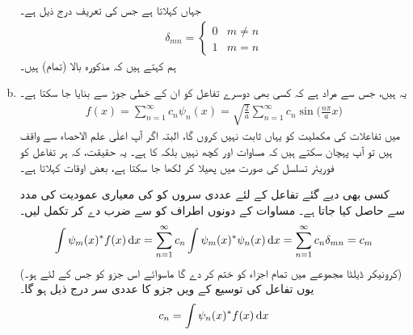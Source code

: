 \begin{enumerate}[a.]
جہاں   کہلاتا ہے جس کی تعریف درج ذیل ہے۔ 
\begin{align}
\delta_{mn}=
\begin{cases}
0& m\neq n\\
1 & m=n
\end{cases}
\end{align} 
ہم کہتے ہیں کہ مذکورہ بالا (تمام)   ہیں۔ 
\item
 یہ  ہیں، جس سے مراد ہے کہ کسی بھی دوسرے تفاعل  کو ان کے خطی جوڑ سے بنایا جا سکتا ہے۔
\begin{align}\label{مساوات_شروڈنگر_کوئی_تفاعل}
f(x)=\sum_{n=1}^{\infty}c_{n}\psi_{n}(x)=\sqrt{\frac{2}{a}}\sum_{n=1}^{\infty}c_{n}\sin\big(\frac{n\pi}{a}x\big)
\end{align}
 میں تفاعلات  کی مکملیت کو یہاں ثابت نہیں کروں گا، البتہ اگر آپ اعلٰی علم الاحصاء سے واقف ہیں تو آپ پہچان سکتے ہیں کہ مساوات  اور کچھ نہیں بلکہ  کا ہے۔ یہ حقیقت، کہ ہر تفاعل کو فوریئر تسلسل کی صورت میں پھیلا کر لکھا جا سکتا ہے، بعض اوقات  کہلاتا ہے۔

کسی بھی دیے گئے تفاعل  کے لئے عددی سروں  کو  کی معیاری عمودیت کی مدد سے حاصل کیا جاتا ہے۔ مساوات  کے دونوں اطراف کو  سے ضرب دے کر تکمل لیں۔
 \begin{align}
\int \psi_{m}(x)^*f(x)\dif{x}=\sum_{n=1}^{\infty}c_{n}\int\psi_{m}(x)^*\psi_{n}(x)\dif{x}=\sum_{n=1}^{\infty}c_{n}\delta_{mn}=c_{m}
\end{align}
(کرونیکر ڈیلٹا مجموعے میں تمام اجزاء کو ختم کر دے گا ماسوائے اس جزو کو جس کے لئے  ہو۔) یوں تفاعل  کی توسیع کے  ویں جزو کا عددی سر درج ذیل ہو گا۔
\begin{align}\label{مساوات_شروڈنگر_عددی_سر}
c_{n}=\int\psi_{n}(x)^*f(x)\dif{x}
\end{align}
\end{enumerate}


